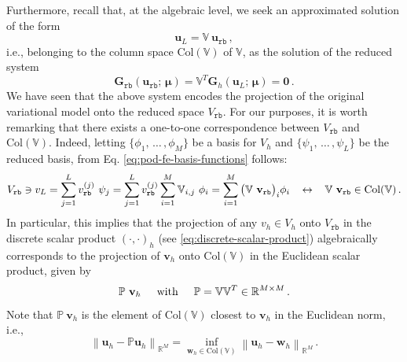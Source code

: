 \documentclass[12pt, a4paper, twoside, openright, notitlepage]{report}
\numberwithin{equation}{chapter}
\theoremstyle{theorem}
\theoremstyle{definition}
\theoremstyle{remark}
\theoremstyle{proposition}
\numberwithin{figure}{chapter}
\newcommand{\norm}[1]{\left\lVert#1\right\rVert}
\newcommand{\bg}[1]{\boldsymbol{#1}}
\begin{document}
		Furthermore, recall that, at the algebraic level, we seek an approximated solution of the form 
		\begin{equation*}
			\mathbf{u}_L = \mathbb{V} ~ \mathbf{u}_{\texttt{rb}} \, ,
		\end{equation*}
		i.e., belonging to the column space $\text{Col}(\mathbb{V})$ of $\mathbb{V}$, as the solution of the reduced system
		\begin{equation*}
			\mathbf{G}_{\texttt{rb}}(\mathbf{u}_{\texttt{rb}}; \, \bg{\mu}) = \mathbb{V}^T \mathbf{G}_h(\mathbf{u}_L; \, \bg{\mu}) = \mathbf{0} \, .
		\end{equation*}
		We have seen that the above system encodes the projection of the original variational model onto the reduced space $V_{\texttt{rb}}$. For our purposes, it is worth remarking that there exists a one-to-one correspondence between $V_{\texttt{rb}}$ and $\text{Col}(\mathbb{V})$. Indeed, letting $\big\lbrace \phi_1, \, \ldots \, , \phi_M \big\rbrace$ be a basis for $V_h$ and $\big\lbrace \psi_1, \, \ldots \, , \psi_L \big\rbrace$ be the reduced basis, from Eq. \eqref{eq:pod-fe-basis-functions} follows:
		\begin{equation*}
			V_{\texttt{rb}} \ni v_{L} = \sum_{j = 1}^L v_{\texttt{rb}}^{(j)} ~ \psi_j = \sum_{j = 1}^L v_{\texttt{rb}}^{(j)} \sum_{i = 1}^M \mathbb{V}_{i,j} ~ \phi_i = \sum_{i = 1}^M \big( \mathbb{V} ~ \mathbf{v}_{\texttt{rb}} \big)_i \phi_i \hspace*{0.3cm} \leftrightarrow \hspace*{0.3cm} \mathbb{V} ~ \mathbf{v}_{\texttt{rb}} \in \text{Col}(\mathbb{V}) \, .
		\end{equation*} 
		In particular, this implies that the projection of any $v_h \in V_h$ onto $V_{\texttt{rb}}$ in the discrete scalar product $(\cdot,\cdot)_h$ (see \eqref{eq:discrete-scalar-product}) algebraically corresponds to the projection of $\mathbf{v}_h$ onto $\text{Col}(\mathbb{V})$ in the Euclidean scalar product, given by
		\begin{equation*}
			\mathbb{P} ~ \mathbf{v}_h \hspace*{0.5cm} \text{with} \hspace*{0.5cm} \mathbb{P} = \mathbb{V} \mathbb{V}^T \in \mathbb{R}^{M \times M} \, .
		\end{equation*}
		Note that $\mathbb{P} ~ \mathbf{v}_h$ is the element of $\text{Col}(\mathbb{V})$ closest to $\mathbf{v}_h$ in the Euclidean norm, i.e.,
		\begin{equation*}
			\norm{\mathbf{u}_h - \mathbb{P} \mathbf{u}_h}_{\mathbb{R}^M} = \inf_{\mathbf{w}_h \in \text{Col}(\mathbb{V})} \norm{\mathbf{u}_h - \mathbf{w}_h}_{\mathbb{R}^M} \, .
		\end{equation*}
\end{document}
